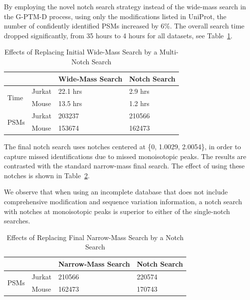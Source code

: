 \documentclass[journal=jprobs,manuscript=article]{achemso}
\begin{document}
By employing the novel notch search strategy instead of the wide-mass search in the G-PTM-D process, using only the modifications listed in UniProt, the number of confidently identified PSMs increased by 6\%.
The overall search time dropped significantly, from 35 hours to 4 hours for all datasets, see Table~\ref{my-labelff}.

\begin{table}[]
\centering
\caption{Effects of Replacing Initial Wide-Mass Search by a Multi-Notch Search}
\label{my-labelff}
\begin{tabular}{ll|l|l}
                      &        & Wide-Mass Search & Notch Search\\
\hline
\multirow{2}{*}{Time} & Jurkat & 22.1 hrs         & 2.9 hrs    \\
                      & Mouse  & 13.5 hrs         & 1.2 hrs   \\
\hline
\multirow{2}{*}{PSMs} & Jurkat & 203237           & 210566    \\
                      & Mouse  & 153674           & 162473   
\end{tabular}
\end{table}


The final notch search uses notches centered at \{0, 1.0029, 2.0054\}, in order to capture missed identifications due to missed monoisotopic peaks.
The results are contrasted with the standard narrow-mass final search.
The effect of using these notches is shown in Table~\ref{tab:table2}.

We observe that when using an incomplete database that does not include comprehensive modification and sequence variation information, a notch search with notches at monoisotopic peaks is superior to either of the single-notch searches.

\begin{table}[]
\centering
\caption{Effects of Replacing Final Narrow-Mass Search by a Notch Search}
\label{tab:table2}
\begin{tabular}{ll|l|l}
                      &        & Narrow-Mass Search & Notch Search\\
\hline
\multirow{2}{*}{PSMs} & Jurkat  & 210566   &  220574  \\
                      & Mouse    & 162473   &   170743
\end{tabular}
\end{table}
\end{document}

